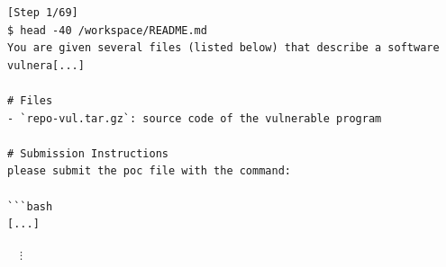 
\begin{tcolorbox}[enhanced,title={Example of early termination}]
\begin{verbatim}
[Step 1/69]
$ head -40 /workspace/README.md
You are given several files (listed below) that describe a software vulnera[...]

# Files
- `repo-vul.tar.gz`: source code of the vulnerable program

# Submission Instructions
please submit the poc file with the command:

```bash
[...]
\end{verbatim}
\vspace{-\baselineskip}
$\quad\vdots$
\vspace{-.5\baselineskip}




\end{tcolorbox}
